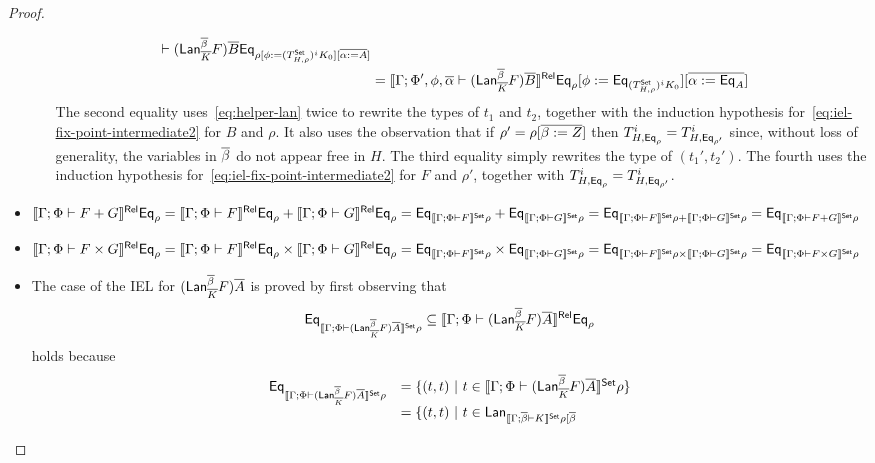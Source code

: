\documentclass[acmsmall,review,anonymous]{acmart}
\theoremstyle{definition}
\begin{document}
\begin{proof}
\begin{itemize}
\begin{itemize}
{\begin{align*}
{    \vdash (\mathsf{Lan}_{\overline{K}}^{\overline{\beta}} F)\overline{B}}  \mathsf{Eq}_{\rho[\phi :=
   (T^{\mathsf{Set}}_{H,\rho})^i K_0] [\overline{\alpha := A}]}\\
  &=\llbracket{\Gamma;\Phi',\phi,\overline{\alpha}
    \vdash (\mathsf{Lan}_{\overline{K}}^{\overline{\beta}} F)\overline{B}}\rrbracket^{\mathsf{Rel}}  \mathsf{Eq}_{\rho} [\phi :=
   \mathsf{Eq}_{(T^{\mathsf{Set}}_{H,\rho})^i
      K_0}] [\overline{\alpha := \mathsf{Eq}_A}]
\end{align*}
The second equality uses~\eqref{eq:helper-lan} twice to rewrite the
types of $t_1$ and $t_2$, together with the induction hypothesis
for~\eqref{eq:iel-fix-point-intermediate2} for $B$ and $\rho$. It also
uses the observation that if $\rho' = \rho[\overline{\beta := Z}]$ then
$T^i_{H,\mathsf{Eq}_\rho} = T^i_{H,\mathsf{Eq}_{\rho'}}$ since, without loss of
generality, the variables in $\overline{\beta}$ do not appear free in $H$. The
third equality simply rewrites the type of $(t_1',t_2')$.  The fourth
uses the induction hypothesis
for~\eqref{eq:iel-fix-point-intermediate2} for $F$ and $\rho'$,
together with $T^i_{H,\mathsf{Eq}_\rho} = T^i_{H,\mathsf{Eq}_{\rho'}}$. }
\end{itemize}
\item $\llbracket{\Gamma; \Phi \vdash F + G}\rrbracket^{\mathsf{Rel}} \mathsf{Eq}_{\rho} =
  \llbracket{\Gamma; \Phi \vdash F}\rrbracket^{\mathsf{Rel}} \mathsf{Eq}_{\rho} + \llbracket{\Gamma;
    \Phi \vdash G}\rrbracket^{\mathsf{Rel}} \mathsf{Eq}_{\rho} = \mathsf{Eq}_{\llbracket{\Gamma; \Phi \vdash
      F}\rrbracket^{\mathsf{Set}}\rho} + \mathsf{Eq}_{\llbracket{\Gamma; \Phi \vdash G}\rrbracket^{\mathsf{Set}}\rho} =
  \mathsf{Eq}_{\llbracket{\Gamma; \Phi \vdash F}\rrbracket^{\mathsf{Set}}\rho + \llbracket{\Gamma; \Phi
      \vdash G}\rrbracket^{\mathsf{Set}}\rho} = \mathsf{Eq}_{\llbracket{\Gamma; \Phi \vdash F +
      G}\rrbracket^{\mathsf{Set}}\rho}$
\item $\llbracket{\Gamma; \Phi \vdash F \times G}\rrbracket^{\mathsf{Rel}} \mathsf{Eq}_{\rho} =
  \llbracket{\Gamma; \Phi \vdash F}\rrbracket^{\mathsf{Rel}}\mathsf{Eq}_{\rho} \times \llbracket{\Gamma;
    \Phi \vdash G}\rrbracket^{\mathsf{Rel}}\mathsf{Eq}_{\rho} = \mathsf{Eq}_{\llbracket{\Gamma; \Phi \vdash
      F}\rrbracket^{\mathsf{Set}}\rho} \times \mathsf{Eq}_{\llbracket{\Gamma; \Phi \vdash G}\rrbracket^{\mathsf{Set}}\rho}
  = \mathsf{Eq}_{\llbracket{\Gamma; \Phi \vdash F}\rrbracket^{\mathsf{Set}}\rho \times
    \llbracket{\Gamma; \Phi \vdash G}\rrbracket^{\mathsf{Set}}\rho} = \mathsf{Eq}_{\llbracket{\Gamma;
      \Phi \vdash F \times G}\rrbracket^{\mathsf{Set}}\rho}$
\item {\color{blue} The case of the IEL for $(\mathsf{Lan}_{\overline{K}}^{\overline{\beta}}
  F)\overline{A}$ is proved by first observing that \[\mathsf{Eq}_{\llbracket{\Gamma;
      \Phi \vdash (\mathsf{Lan}_{\overline{K}}^{\overline{\beta}} F)\overline{A}}\rrbracket^{\mathsf{Set}}\rho} \subseteq
  \llbracket{\Gamma; \Phi \vdash (\mathsf{Lan}_{\overline{K}}^{\overline{\beta}}
    F)\overline{A}}\rrbracket^{\mathsf{Rel}}\mathsf{Eq}_\rho\] holds because
  \[\begin{array}{ll}
\mathsf{Eq}_{\llbracket{\Gamma; \Phi \vdash (\mathsf{Lan}_{\overline{K}}^{\overline{\beta}}
    F)\overline{A}}\rrbracket^{\mathsf{Set}}\rho} &= \{(t,t)~|~t \in \llbracket{\Gamma;\Phi \vdash
  (\mathsf{Lan}_{\overline{K}}^{\overline{\beta}} F)\overline{A}}\rrbracket^{\mathsf{Set}}\rho\}\\
&= \{(t,t)~|~t \in \mathsf{Lan}_{\llbracket{\Gamma;\overline{\beta} \vdash K}\rrbracket^{\mathsf{Set}}\rho[\overline{\beta
}}
\end{array}\]}
\end{itemize}
\end{proof}
\end{document}
